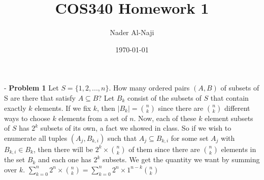 \documentclass[11pt]{article}
\begin{document}
\title{COS340 Homework 1}
\author{Nader Al-Naji}
\date{\today}
\maketitle
-
\newline
\textbf{Problem 1}
\newline
\newline
Let $S = \{1,2, ...,n\}$. How many ordered pairs $(A,B)$ of subsets of S are there that satisfy $A \subseteq B$?
\newline
\newline
Let $B_k$ consist of the subsets of $S$ that contain exactly $k$ elements. If we fix $k$, then $|B_k| = $$n \choose k$ since there are
$n \choose k$ different ways to choose $k$ elements from a set of $n$. Now, each of these $k$ element subsets of $S$ has $2^k$ subsets of its
own, a fact we showed in class. So if we wish to enumerate all tuples $(A_{j}, B_{k,i})$ such that $A_{j} \subseteq B_{k,i}$ for some set $A_j$ with $B_{k,i} \in B_k$, then
there will be $2^k \times $$n \choose k$ of them since there are $n \choose k$ elements in the set $B_k$ and each one has
$2^k$ subsets. We get the quantity we want by summing over $k$. $\sum_{k=0}^n 2^n \times $$n \choose k$$ = $$\sum_{k=0}^n 2^n \times 1^{n-k} $$n \choose k$
\end{document}
